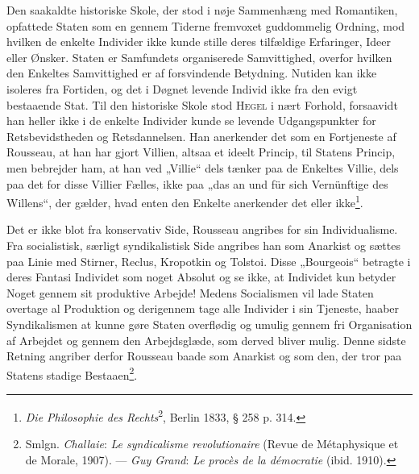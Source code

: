 \documentclass[12pt,a4paper,openany]{book}
\newcommand{\opage}[1]{\marginnote{\footnotesize\textit{[#1]}}}
\begin{document}
Den saakaldte historiske Skole, der stod i nøje Sammenhæng
med Romantiken, opfattede Staten som en gennem Tiderne
fremvoxet guddommelig Ordning, mod hvilken de enkelte
\setcounter{footnote}{0}%
\opage{139}Individer ikke kunde stille deres tilfældige Erfaringer, Ideer
eller Ønsker. Staten er Samfundets organiserede Samvittighed,
overfor hvilken den Enkeltes Samvittighed er af forsvindende
Betydning. Nutiden kan ikke isoleres fra Fortiden, og det i
Døgnet levende Individ ikke fra den evigt bestaaende Stat. Til
den historiske Skole stod \textsc{Hegel} i nært Forhold, forsaavidt han
heller ikke i de enkelte Individer kunde se levende Udgangspunkter
for Retsbevidstheden og Retsdannelsen. Han anerkender
det som en Fortjeneste af Rousseau, at han har gjort Villien,
altsaa et ideelt Princip, til Statens Princip, men bebrejder
ham, at han ved „Villie“ dels tænker paa de Enkeltes Villie,
dels paa det for disse Villier Fælles, ikke paa „das an und für
sich Vernünftige des Willens“, der gælder, hvad enten den
Enkelte anerkender det eller ikke\footnote[1]{\textit{Die Philosophie des Rechts}\textsuperscript{2}, Berlin 1833, § 258 p. 314.}.

Det er ikke blot fra konservativ Side, Rousseau angribes
for sin Individualisme. Fra socialistisk, særligt syndikalistisk
Side angribes han som Anarkist og sættes paa Linie med Stirner,
Reclus, Kropotkin og Tolstoi. Disse „Bourgeois“ betragte
i deres Fantasi Individet som noget Absolut og se ikke, at Individet
kun betyder Noget gennem sit produktive Arbejde!
Medens Socialismen vil lade Staten overtage al Produktion og
derigennem tage alle Individer i sin Tjeneste, haaber Syndikalismen
at kunne gøre Staten overflødig og umulig gennem fri
Organisation af Arbejdet og gennem den Arbejdsglæde, som
derved bliver mulig. Denne sidste Retning angriber derfor
Rousseau baade som Anarkist og som den, der tror paa Statens
stadige Bestaaen\footnote[2]{Smlgn. \emph{Challaie}: \textit{Le syndicalisme revolutionaire} (Revue de Métaphysique et de Morale, 1907). --- \emph{Guy Grand}: \textit{Le procès de la démocratie} (ibid. 1910).}.
\end{document}
